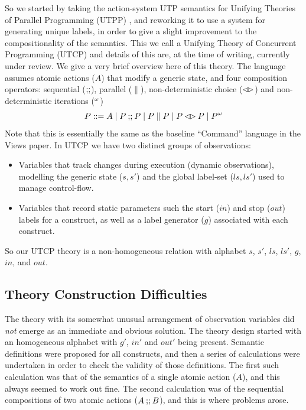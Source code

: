 So we started by taking the action-system UTP semantics for Unifying Theories
of Parallel Programming (UTPP) \cite{DBLP:conf/icfem/WoodcockH02},
and reworking it to use a system for generating unique labels,
in order to give a slight improvement to the compositionality
of the semantics. This we call a Unifying Theory of Concurrent Programming
(UTCP) and details of this are,
at the time of writing,
currently under review\cite{conf/tase/BMN165}.
We give a very brief overview here of this theory.
The language assumes atomic actions ($A$) that modify a generic state,
and four composition operators: sequential ($\mathrel{\mathbf{;\!;}}$), parallel ($\parallel$),
non-deterministic choice ($\mathbin{\lhd\!\rhd}$) and non-deterministic iterations (${}^{\omega}$)
\[
   P ::= A \mid P \mathbin{\mathbf{;\!;}} P \mid P \parallel P \mid P \mathbin{\lhd\!\rhd} P \mid {P}^{\omega}
\]
Note that this is essentially the same as the baseline ``Command'' language
in the Views paper\cite{conf/popl/Dinsdale-YoungBGPY13}.
In UTCP we have two distinct groups of observations:
\begin{itemize}
  \item
    Variables that track changes during execution
    (dynamic observations),
    modelling the generic state ($s,s'$)
    and the global label-set ($ls,ls'$) used to manage control-flow.
  \item
    Variables that record static parameters such the start ($in$)
    and stop ($out$) labels for a construct,
    as well as a label generator ($g$) associated with each construct.
\end{itemize}
So our UTCP theory is a non-homogeneous relation
with alphabet $s$, $s'$, $ls$, $ls'$, $g$, $in$, and $out$.


\subsection{Theory Construction Difficulties}\label{ssec:difficulties}

The theory with its somewhat unusual arrangement of observation variables
did \emph{not} emerge as an immediate and obvious solution.
The theory design started with an homogeneous alphabet with $g'$, $in'$ and $out'$
being present.
Semantic definitions were proposed for all constructs,
and then a series of calculations were undertaken in order to check
the validity of those definitions.
The first such calculation was that of the semantics of a single atomic
action ($A$), and this always seemed to work out fine.
The second calculation was of the sequential compositions of two atomic
actions ($A\mathbin{\mathbf{;\!;}} B$), and this is where problems arose.

